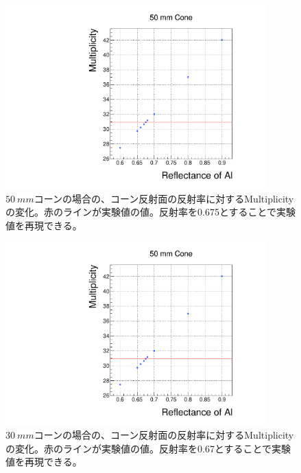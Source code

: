 \begin{figure}[htbp]
  \centering
  \includegraphics[width=10cm, page=1]{images/chapter4/decideAl.pdf}
  \caption{$\SI{50}{mm}$コーンの場合の、コーン反射面の反射率に対するMultiplicityの変化。赤のラインが実験値の値。反射率を0.675とすることで実験値を再現できる。}
  \label{fig:decideAl_50}
\end{figure}
\begin{figure}[htbp]
  \centering
  \includegraphics[width=10cm, page=2]{images/chapter4/decideAl.pdf}
  \caption{$\SI{30}{mm}$コーンの場合の、コーン反射面の反射率に対するMultiplicityの変化。赤のラインが実験値の値。反射率を0.67とすることで実験値を再現できる。}
  \label{fig:decideAl_30}
\end{figure}